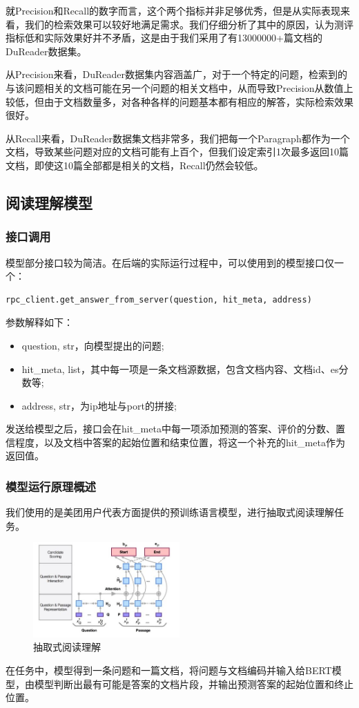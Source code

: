 \documentclass[12pt]{article}
\begin{document}
就Precision和Recall的数字而言，这个两个指标并非足够优秀，但是从实际表现来看，我们的检索效果可以较好地满足需求。我们仔细分析了其中的原因，认为测评指标低和实际效果好并不矛盾，这是由于我们采用了有13000000+篇文档的DuReader数据集。

从Precision来看，DuReader数据集内容涵盖广，对于一个特定的问题，检索到的与该问题相关的文档可能在另一个问题的相关文档中，从而导致Precision从数值上较低，但由于文档数量多，对各种各样的问题基本都有相应的解答，实际检索效果很好。

从Recall来看，DuReader数据集文档非常多，我们把每一个Paragraph都作为一个文档，导致某些问题对应的文档可能有上百个，但我们设定索引1次最多返回10篇文档，即使这10篇全部都是相关的文档，Recall仍然会较低。

\subsection{阅读理解模型}  %
\subsubsection{接口调用}
模型部分接口较为简洁。在后端的实际运行过程中，可以使用到的模型接口仅一个：

\begin{lstlisting}
rpc_client.get_answer_from_server(question, hit_meta, address)
\end{lstlisting}

参数解释如下：
\begin{itemize}
  \item question, str，向模型提出的问题;
  \item hit\_meta, list，其中每一项是一条文档源数据，包含文档内容、文档id、es分数等;
  \item address, str，为ip地址与port的拼接;
\end{itemize}

发送给模型之后，接口会在hit\_meta中每一项添加预测的答案、评价的分数、置信程度，以及文档中答案的起始位置和结束位置，将这一个补充的hit\_meta作为返回值。

\subsubsection{模型运行原理概述}
我们使用的是美团用户代表方面提供的预训练语言模型，进行抽取式阅读理解任务\cite{MRC-MODEL}。
\begin{figure}[H]  %
    \centering  %
    \includegraphics[width=0.5\textwidth]{fig/MRC-model.jpg}
    \caption{抽取式阅读理解}  %
\end{figure}
在任务中，模型得到一条问题和一篇文档，将问题与文档编码并输入给BERT模型，由模型判断出最有可能是答案的文档片段，并输出预测答案的起始位置和终止位置。
\end{document}
